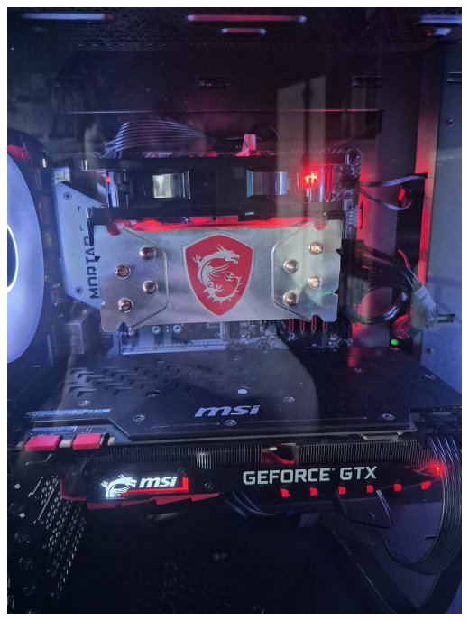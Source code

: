 \documentclass{report}
\begin{document}
\begin{minipage}{0.6\textwidth}
    \lipsum[1]
    \includegraphics[width=\linewidth]{cooler.jpg}
\end{minipage}
\hspace{10pt}
\end{document}
